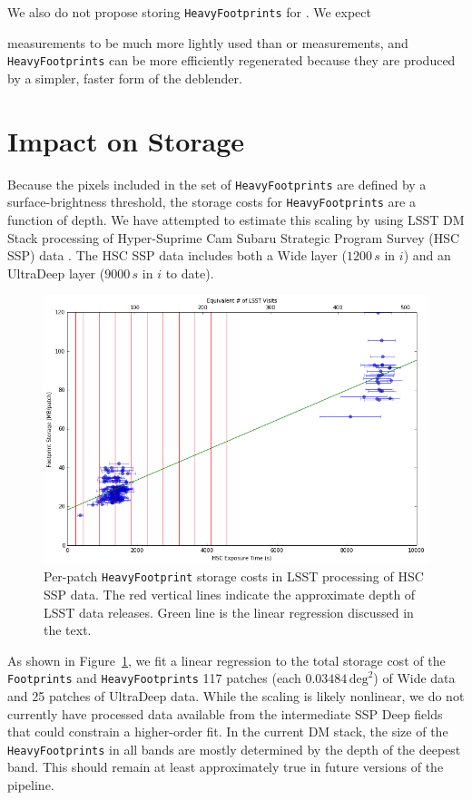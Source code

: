 \documentclass[DM,lsstdraft,toc]{lsstdoc}
\begin{document}
We also do not propose storing \texttt{HeavyFootprints} for \Source.  We expect {\Source measurements to be much more lightly used than \Object or \ForcedSource measurements, and \Source \texttt{HeavyFootprints} can be more efficiently regenerated because they are produced by a simpler, faster form of the deblender.

\section{Impact on Storage}

Because the pixels included in the set of \texttt{HeavyFootprints} are defined by a surface-brightness threshold, the storage costs for \texttt{HeavyFootprints} are a function of depth.  We have attempted to estimate this scaling by using LSST DM Stack processing of Hyper-Suprime Cam Subaru Strategic Program Survey (HSC SSP) data \citep{2017arXiv170208449A}.  The HSC SSP data includes both a Wide layer ($1200\,s$ in $i$) and an UltraDeep layer ($9000\,s$ in $i$ to date).

\begin{figure}
\includegraphics[width=\textwidth]{regression.png}
\caption{Per-patch \texttt{HeavyFootprint} storage costs in LSST processing of HSC SSP data.  The red vertical lines indicate the approximate depth of LSST data releases.  Green line is the linear regression discussed in the text.}
\label{fig:regression}
\end{figure}


As shown in Figure~\ref{fig:regression}, we fit a linear regression to the total storage cost of the \texttt{Footprints} and \texttt{HeavyFootprints} 117 patches (each $0.03484\,\mathrm{deg}^2$) of Wide data and 25 patches of UltraDeep data.  While the scaling is likely nonlinear, we do not currently have processed data available from the intermediate SSP Deep fields that could constrain a higher-order fit.  In the current DM stack, the size of the \texttt{HeavyFootprints} in all bands are mostly determined by the depth of the deepest band.  This should remain at least approximately true in future versions of the pipeline.

}
\end{document}
